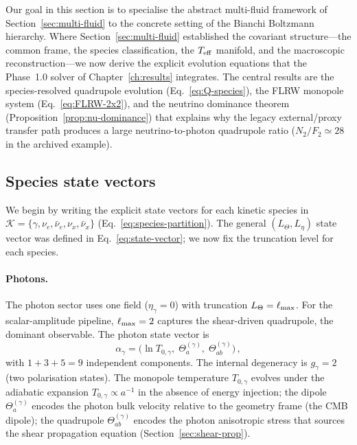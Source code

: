 Our goal in this section is to specialise the abstract
multi-fluid framework of Section~\ref{sec:multi-fluid}
to the concrete setting of the Bianchi Boltzmann hierarchy.
Where Section~\ref{sec:multi-fluid} established the
covariant structure---the common frame, the species
classification, the $T_{\mathrm{eff}}$ manifold, and the macroscopic
reconstruction---we now derive the explicit evolution
equations that the Phase~1.0 solver of
Chapter~\ref{ch:results} integrates.  The central results
are the species-resolved quadrupole evolution
(Eq.~\ref{eq:Q-species}), the FLRW monopole system
(Eq.~\ref{eq:FLRW-2x2}), and the neutrino dominance
theorem (Proposition~\ref{prop:nu-dominance}) that
explains why the legacy external/proxy transfer path produces
a large neutrino-to-photon quadrupole ratio
($N_2/F_2 \simeq 28$ in the archived example).


\subsection{Species state vectors}
\label{sec:species-state}

We begin by writing the explicit state vectors for
each kinetic species in $\mathcal{K} = \{\gamma, \nu_e,
\bar{\nu}_e, \nu_x, \bar{\nu}_x\}$
(Eq.~\ref{eq:species-partition}).  The general
$(L_\Theta, L_\eta)$ state vector was defined in
Eq.~\eqref{eq:state-vector}; we now fix the truncation
level for each species.


\paragraph{Photons.}

The photon sector uses one field ($\eta_\gamma = 0$)
with truncation $L_\Theta = \ell_{\rm max}$.
For the scalar-amplitude pipeline, $\ell_{\rm max} = 2$
captures the shear-driven quadrupole, the dominant
observable.  The photon state vector is
\begin{equation}\label{eq:photon-state}
\alpha_\gamma
= \big(
\ln T_{0,\gamma},\;
\Theta^{(\gamma)}_a,\;
\Theta^{(\gamma)}_{ab}
\big)\,,
\end{equation}
with $1 + 3 + 5 = 9$ independent components.  The
internal degeneracy is $g_\gamma = 2$ (two polarisation
states).  The monopole temperature $T_{0,\gamma}$
evolves under the adiabatic expansion
$T_{0,\gamma} \propto a^{-1}$ in the absence of
energy injection; the dipole $\Theta^{(\gamma)}_a$
encodes the photon bulk velocity relative to the
geometry frame (the CMB dipole); the quadrupole
$\Theta^{(\gamma)}_{ab}$ encodes the photon anisotropic
stress that sources the shear propagation equation
(Section~\ref{sec:shear-prop}).


